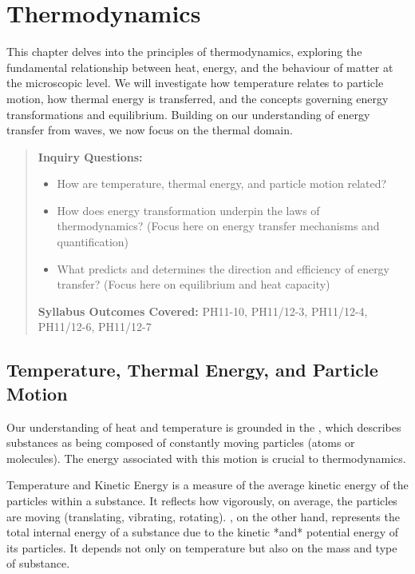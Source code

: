 
\chapter{Thermodynamics}
\label{ch:thermodynamics}
\FloatBarrier %

This chapter delves into the principles of thermodynamics, exploring the fundamental relationship between heat, energy, and the behaviour of matter at the microscopic level. We will investigate how temperature relates to particle motion, how thermal energy is transferred, and the concepts governing energy transformations and equilibrium. Building on our understanding of energy transfer from waves, we now focus on the thermal domain.

\blockquote{
\textbf{Inquiry Questions:}
\begin{itemize}
    \item How are temperature, thermal energy, and particle motion related?
    \item How does energy transformation underpin the laws of thermodynamics? (Focus here on energy transfer mechanisms and quantification)
    \item What predicts and determines the direction and efficiency of energy transfer? (Focus here on equilibrium and heat capacity)
\end{itemize}
\textbf{Syllabus Outcomes Covered:} PH11-10, PH11/12-3, PH11/12-4, PH11/12-6, PH11/12-7
}

\section{Temperature, Thermal Energy, and Particle Motion}
\label{sec:temp_energy_particle}
\FloatBarrier

Our understanding of heat and temperature is grounded in the , which describes substances as being composed of constantly moving particles (atoms or molecules). The energy associated with this motion is crucial to thermodynamics.

\begin{keyconcept}{Temperature and Kinetic Energy}
 is a measure of the average kinetic energy of the particles within a substance. It reflects how vigorously, on average, the particles are moving (translating, vibrating, rotating). , on the other hand, represents the total internal energy of a substance due to the kinetic *and* potential energy of its particles. It depends not only on temperature but also on the mass and type of substance.
\end{keyconcept}


